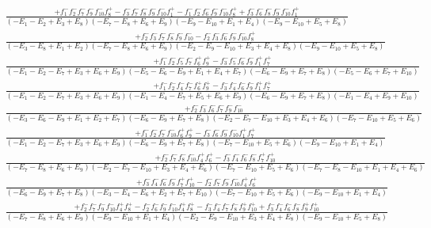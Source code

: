 \documentclass{article}
\begin{document}
\[\begin{array}{rcl}
\frac{+f_{1}^{-}f_{2}^{-}f_{7}^{-}f_{9}^{-}f_{10}^{-}f_{8}^{+}-f_{3}^{-}f_{7}^{-}f_{8}^{-}f_{9}^{-}f_{10}^{-}f_{1}^{+}-f_{1}^{-}f_{2}^{-}f_{6}^{-}f_{9}^{-}f_{10}^{-}f_{8}^{+}+f_{3}^{-}f_{6}^{-}f_{8}^{-}f_{9}^{-}f_{10}^{-}f_{1}^{+}}{(-E_{1}-E_{2}+E_{3}+E_{8})(-E_{7}-E_{8}+E_{6}+E_{9})(-E_{9}-E_{10}+E_{1}+E_{4})(-E_{9}-E_{10}+E_{5}+E_{8})}\\
\frac{+f_{2}^{-}f_{3}^{-}f_{7}^{-}f_{8}^{-}f_{9}^{-}f_{10}^{-}-f_{2}^{-}f_{3}^{-}f_{6}^{-}f_{9}^{-}f_{10}^{-}f_{8}^{+}}{(-E_{3}-E_{8}+E_{1}+E_{2})(-E_{7}-E_{8}+E_{6}+E_{9})(-E_{2}-E_{9}-E_{10}+E_{3}+E_{4}+E_{8})(-E_{9}-E_{10}+E_{5}+E_{8})}\\
\frac{+f_{1}^{-}f_{2}^{-}f_{5}^{-}f_{7}^{-}f_{6}^{+}f_{9}^{+}-f_{3}^{-}f_{5}^{-}f_{6}^{-}f_{9}^{-}f_{1}^{+}f_{7}^{+}}{(-E_{1}-E_{2}-E_{7}+E_{3}+E_{6}+E_{9})(-E_{5}-E_{6}-E_{9}+E_{1}+E_{4}+E_{7})(-E_{6}-E_{9}+E_{7}+E_{8})(-E_{5}-E_{6}+E_{7}+E_{10})}\\
\frac{+f_{1}^{-}f_{2}^{-}f_{4}^{-}f_{7}^{-}f_{6}^{+}f_{9}^{+}-f_{3}^{-}f_{4}^{-}f_{6}^{-}f_{9}^{-}f_{1}^{+}f_{7}^{+}}{(-E_{1}-E_{2}-E_{7}+E_{3}+E_{6}+E_{9})(-E_{1}-E_{4}-E_{7}+E_{5}+E_{6}+E_{9})(-E_{6}-E_{9}+E_{7}+E_{8})(-E_{1}-E_{4}+E_{9}+E_{10})}\\
\frac{+f_{2}^{-}f_{3}^{-}f_{6}^{-}f_{7}^{-}f_{9}^{-}f_{10}^{-}}{(-E_{3}-E_{6}-E_{9}+E_{1}+E_{2}+E_{7})(-E_{6}-E_{9}+E_{7}+E_{8})(-E_{2}-E_{7}-E_{10}+E_{3}+E_{4}+E_{6})(-E_{7}-E_{10}+E_{5}+E_{6})}\\
\frac{+f_{1}^{-}f_{2}^{-}f_{7}^{-}f_{10}^{-}f_{6}^{+}f_{9}^{+}-f_{3}^{-}f_{6}^{-}f_{9}^{-}f_{10}^{-}f_{1}^{+}f_{7}^{+}}{(-E_{1}-E_{2}-E_{7}+E_{3}+E_{6}+E_{9})(-E_{6}-E_{9}+E_{7}+E_{8})(-E_{7}-E_{10}+E_{5}+E_{6})(-E_{9}-E_{10}+E_{1}+E_{4})}\\
\frac{+f_{2}^{-}f_{7}^{-}f_{8}^{-}f_{10}^{-}f_{4}^{+}f_{6}^{+}-f_{3}^{-}f_{4}^{-}f_{6}^{-}f_{8}^{-}f_{7}^{+}f_{10}^{+}}{(-E_{7}-E_{8}+E_{6}+E_{9})(-E_{2}-E_{7}-E_{10}+E_{3}+E_{4}+E_{6})(-E_{7}-E_{10}+E_{5}+E_{6})(-E_{7}-E_{8}-E_{10}+E_{1}+E_{4}+E_{6})}\\
\frac{+f_{3}^{-}f_{4}^{-}f_{6}^{-}f_{9}^{-}f_{7}^{+}f_{10}^{+}-f_{2}^{-}f_{7}^{-}f_{9}^{-}f_{10}^{-}f_{4}^{+}f_{6}^{+}}{(-E_{6}-E_{9}+E_{7}+E_{8})(-E_{3}-E_{4}-E_{6}+E_{2}+E_{7}+E_{10})(-E_{7}-E_{10}+E_{5}+E_{6})(-E_{9}-E_{10}+E_{1}+E_{4})}\\
\frac{+f_{2}^{-}f_{7}^{-}f_{9}^{-}f_{10}^{-}f_{4}^{+}f_{8}^{+}-f_{2}^{-}f_{6}^{-}f_{9}^{-}f_{10}^{-}f_{4}^{+}f_{8}^{+}-f_{3}^{-}f_{4}^{-}f_{7}^{-}f_{8}^{-}f_{9}^{+}f_{10}^{+}+f_{3}^{-}f_{4}^{-}f_{6}^{-}f_{8}^{-}f_{9}^{+}f_{10}^{+}}{(-E_{7}-E_{8}+E_{6}+E_{9})(-E_{9}-E_{10}+E_{1}+E_{4})(-E_{2}-E_{9}-E_{10}+E_{3}+E_{4}+E_{8})(-E_{9}-E_{10}+E_{5}+E_{8})}\\

\end{array}\]
\end{document}
